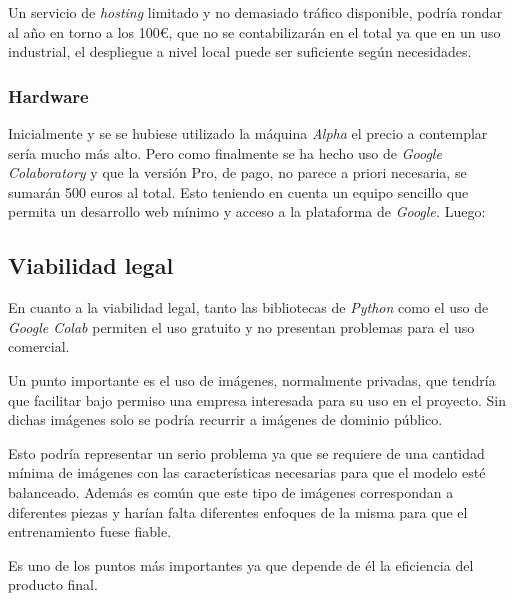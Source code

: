 Un servicio de \emph{hosting} limitado y no demasiado tráfico disponible, podría rondar al año en torno a los 100\euro, que no se contabilizarán en el total ya que en un uso industrial, el despliegue a nivel local puede ser suficiente según necesidades.

\clearpage

\subsubsection{Hardware}
Inicialmente y se se hubiese utilizado la máquina \emph{Alpha} el precio a contemplar sería mucho más alto.
Pero como finalmente se ha hecho uso de \emph{Google Colaboratory} y que la versión Pro, de pago, no parece a priori necesaria, se sumarán 500 euros al total. Esto teniendo en cuenta un equipo sencillo que permita un desarrollo web mínimo y acceso a la plataforma de \emph{Google.} Luego:

  
\subsection{Viabilidad legal}
En cuanto a la viabilidad legal, tanto las bibliotecas de \emph{Python} como el uso de \emph{Google Colab} permiten el uso gratuito y no presentan problemas para el uso comercial.

Un punto importante es el uso de imágenes, normalmente privadas, que tendría que facilitar bajo permiso una empresa interesada para su uso en el proyecto. Sin dichas imágenes solo se podría recurrir a imágenes de dominio público.

Esto podría representar un serio problema ya que se requiere de una cantidad mínima de imágenes con las características necesarias para que el modelo esté balanceado. Además es común que este tipo de imágenes correspondan a diferentes piezas y harían falta diferentes enfoques de la misma para que el entrenamiento fuese fiable.

Es uno de los puntos más importantes ya que depende de él la eficiencia del producto final.

